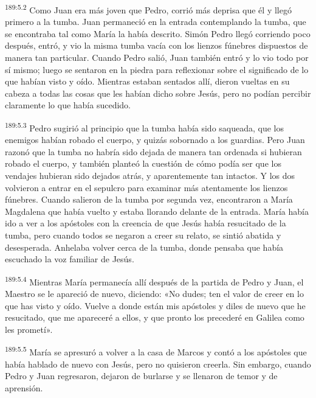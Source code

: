 \par 
\textsuperscript{189:5.2} Como Juan era más joven que Pedro, corrió más deprisa que él y llegó primero a la tumba. Juan permaneció en la entrada contemplando la tumba, que se encontraba tal como María la había descrito. Simón Pedro llegó corriendo poco después, entró, y vio la misma tumba vacía con los lienzos fúnebres dispuestos de manera tan particular. Cuando Pedro salió, Juan también entró y lo vio todo por sí mismo; luego se sentaron en la piedra para reflexionar sobre el significado de lo que habían visto y oído. Mientras estaban sentados allí, dieron vueltas en su cabeza a todas las cosas que les habían dicho sobre Jesús, pero no podían percibir claramente lo que había sucedido.

\par 
\textsuperscript{189:5.3} Pedro sugirió al principio que la tumba había sido saqueada, que los enemigos habían robado el cuerpo, y quizás sobornado a los guardias. Pero Juan razonó que la tumba no habría sido dejada de manera tan ordenada si hubieran robado el cuerpo, y también planteó la cuestión de cómo podía ser que los vendajes hubieran sido dejados atrás, y aparentemente tan intactos. Y los dos volvieron a entrar en el sepulcro para examinar más atentamente los lienzos fúnebres. Cuando salieron de la tumba por segunda vez, encontraron a María Magdalena que había vuelto y estaba llorando delante de la entrada. María había ido a ver a los apóstoles con la creencia de que Jesús había resucitado de la tumba, pero cuando todos se negaron a creer su relato, se sintió abatida y desesperada. Anhelaba volver cerca de la tumba, donde pensaba que había escuchado la voz familiar de Jesús.

\par 
\textsuperscript{189:5.4} Mientras María permanecía allí después de la partida de Pedro y Juan, el Maestro se le apareció de nuevo, diciendo: «No dudes; ten el valor de creer en lo que has visto y oído. Vuelve a donde están mis apóstoles y diles de nuevo que he resucitado, que me apareceré a ellos, y que pronto los precederé en Galilea como les prometí».

\par 
\textsuperscript{189:5.5} María se apresuró a volver a la casa de Marcos y contó a los apóstoles que había hablado de nuevo con Jesús, pero no quisieron creerla. Sin embargo, cuando Pedro y Juan regresaron, dejaron de burlarse y se llenaron de temor y de aprensión.